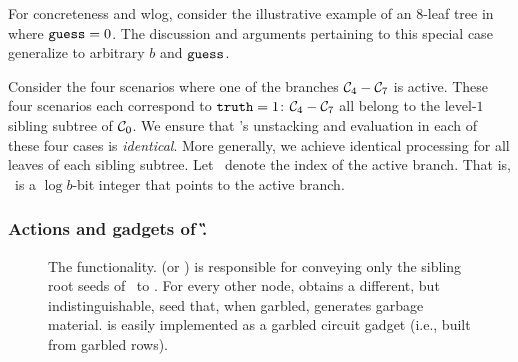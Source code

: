 For concreteness and wlog,
consider the illustrative example of an $8$-leaf tree in~ where $\mathtt{guess}=0$. 
The discussion and arguments pertaining to this special case generalize to arbitrary $b$ and $\mathtt{guess}$.

Consider the four scenarios where one of the branches $\mathcal C_4-\mathcal C_7$ is active.
These four scenarios each correspond
to $\mathtt{truth} = 1$: $\mathcal C_4-\mathcal C_7$ all belong to the level-$1$ sibling subtree of
$\mathcal C_0$.
%
We ensure that \E's unstacking and evaluation in each
of these four cases is \emph{identical}.  More generally, we achieve identical processing for all leaves of each sibling subtree.
Let \aid\ denote the index of the active branch. That is, \aid\ is a $\log
b$-bit integer that points to the active branch.


\subsubsection{Actions and gadgets of \G.}

\begin{figure}[t!]\centering{}\caption{%
  The \gadgetlong functionality. \gadgetlong (or \gadget) is
  responsible for conveying only the sibling root seeds of \aid\ to \E.
  For every other node, \E obtains a different, but indistinguishable,
  seed that, when garbled, generates garbage material.
  \gadgetlong is easily implemented as a garbled circuit gadget (i.e.,
  built from garbled rows).
}\label{fig:sortinghat}
\end{figure}

